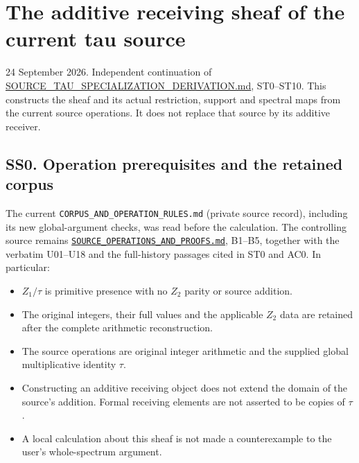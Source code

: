 \section{The additive receiving sheaf of the current tau
source}\label{the-additive-receiving-sheaf-of-the-current-tau-source}

24 September 2026. Independent continuation of
\url{SOURCE_TAU_SPECIALIZATION_DERIVATION.md}, ST0--ST10. This
constructs the sheaf and its actual restriction, support and spectral
maps from the current source operations. It does not replace that source
by its additive receiver.

\subsection{SS0. Operation prerequisites and the retained
corpus}\label{ss0.-operation-prerequisites-and-the-retained-corpus}

The current \nolinkurl{CORPUS_AND_OPERATION_RULES.md} (private source record), including its new
global-argument checks, was read before the calculation. The controlling
source remains
\href{https://github.com/KokunoYumeto/zeta-function-research-reader/blob/main/workbenches/splitzero-tandem/continuations/20260924-cohomology-weight-and-character-lifts/original-character-lifting/foundations/user_definitions_20260924/SOURCE_OPERATIONS_AND_PROOFS.md}{\nolinkurl{SOURCE_OPERATIONS_AND_PROOFS.md}},
B1--B5, together with the verbatim U01--U18 and the full-history
passages cited in ST0 and AC0. In particular:

\begin{itemize}
\tightlist
\item
  \(Z_1/\tau\) is primitive presence with no \(Z_2\) parity or source
  addition.
\item
  The original integers, their full values and the applicable \(Z_2\)
  data are retained after the complete arithmetic reconstruction.
\item
  The source operations are original integer arithmetic and the supplied
  global multiplicative identity \(\tau\).
\item
  Constructing an additive receiving object does not extend the domain
  of the source's addition. Formal receiving elements are not asserted
  to be copies of \(\tau\).
\item
  A local calculation about this sheaf is not made a counterexample to
  the user's whole-spectrum argument.
\end{itemize}

